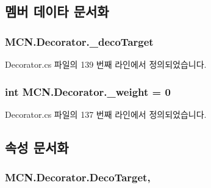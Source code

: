 \subsection{멤버 데이타 문서화}
\subsubsection[{\texorpdfstring{\+\_\+deco\+Target}{_decoTarget}}]{ M\+C\+N.\+Decorator.\+\_\+deco\+Target\hspace{0.3cm}{\ttfamily [private]}}\hypertarget{class_m_c_n_1_1_decorator_a1ec6050ce16016f709aa8e8c19444678}{}\label{class_m_c_n_1_1_decorator_a1ec6050ce16016f709aa8e8c19444678}


Decorator.\+cs 파일의 139 번째 라인에서 정의되었습니다.

\subsubsection[{\texorpdfstring{\+\_\+weight}{_weight}}]{\setlength{\rightskip}{0pt plus 5cm}int M\+C\+N.\+Decorator.\+\_\+weight = 0\hspace{0.3cm}{\ttfamily [private]}}\hypertarget{class_m_c_n_1_1_decorator_af352c49463e8b4c138f783b292642f98}{}\label{class_m_c_n_1_1_decorator_af352c49463e8b4c138f783b292642f98}


Decorator.\+cs 파일의 137 번째 라인에서 정의되었습니다.



\subsection{속성 문서화}
\subsubsection[{\texorpdfstring{Deco\+Target}{DecoTarget}}]{ M\+C\+N.\+Decorator.\+Deco\+Target\hspace{0.3cm}{\ttfamily [get]}, {\ttfamily [protected]}}\hypertarget{class_m_c_n_1_1_decorator_a1306a0a8b814650cd5970a1ffc7ba2fe}{}\label{class_m_c_n_1_1_decorator_a1306a0a8b814650cd5970a1ffc7ba2fe}


